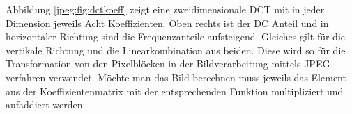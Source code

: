 Abbildung \ref{jpeg:fig:dctkoeff}  zeigt eine zweidimensionale DCT mit in jeder Dimension jeweils Acht Koeffizienten.
Oben rechts ist der DC Anteil und in horizontaler Richtung sind die Frequenzanteile aufsteigend.
Gleiches gilt für die vertikale Richtung und die Linearkombination aus beiden.
Diese wird so für die Transformation von den Pixelblöcken in der Bildverarbeitung mittels JPEG verfahren verwendet.
Möchte man das Bild berechnen muss jeweils das Element aus der Koeffizientenmatrix mit der entsprechenden Funktion multipliziert und aufaddiert werden.

